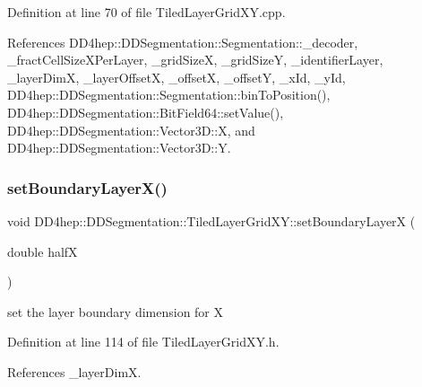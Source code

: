 Definition at line 70 of file Tiled\+Layer\+Grid\+X\+Y.\+cpp.



References D\+D4hep\+::\+D\+D\+Segmentation\+::\+Segmentation\+::\+\_\+decoder, \+\_\+fract\+Cell\+Size\+X\+Per\+Layer, \+\_\+grid\+SizeX, \+\_\+grid\+SizeY, \+\_\+identifier\+Layer, \+\_\+layer\+DimX, \+\_\+layer\+OffsetX, \+\_\+offsetX, \+\_\+offsetY, \+\_\+x\+Id, \+\_\+y\+Id, D\+D4hep\+::\+D\+D\+Segmentation\+::\+Segmentation\+::bin\+To\+Position(), D\+D4hep\+::\+D\+D\+Segmentation\+::\+Bit\+Field64\+::set\+Value(), D\+D4hep\+::\+D\+D\+Segmentation\+::\+Vector3\+D\+::X, and D\+D4hep\+::\+D\+D\+Segmentation\+::\+Vector3\+D\+::Y.

\hypertarget{class_d_d4hep_1_1_d_d_segmentation_1_1_tiled_layer_grid_x_y_a713a5e8262e11c1806893ead420f116d}{}\label{class_d_d4hep_1_1_d_d_segmentation_1_1_tiled_layer_grid_x_y_a713a5e8262e11c1806893ead420f116d} 
\subsubsection{\texorpdfstring{set\+Boundary\+Layer\+X()}{setBoundaryLayerX()}}
{\footnotesize\ttfamily void D\+D4hep\+::\+D\+D\+Segmentation\+::\+Tiled\+Layer\+Grid\+X\+Y\+::set\+Boundary\+LayerX (\begin{DoxyParamCaption}\item[{double}]{halfX }\end{DoxyParamCaption})\hspace{0.3cm}{\ttfamily [inline]}}



set the layer boundary dimension for X 



Definition at line 114 of file Tiled\+Layer\+Grid\+X\+Y.\+h.



References \+\_\+layer\+DimX.

\hypertarget{class_d_d4hep_1_1_d_d_segmentation_1_1_tiled_layer_grid_x_y_a2bf0d13d0e1ea42c698c10339e220590}{}\label{class_d_d4hep_1_1_d_d_segmentation_1_1_tiled_layer_grid_x_y_a2bf0d13d0e1ea42c698c10339e220590} 
